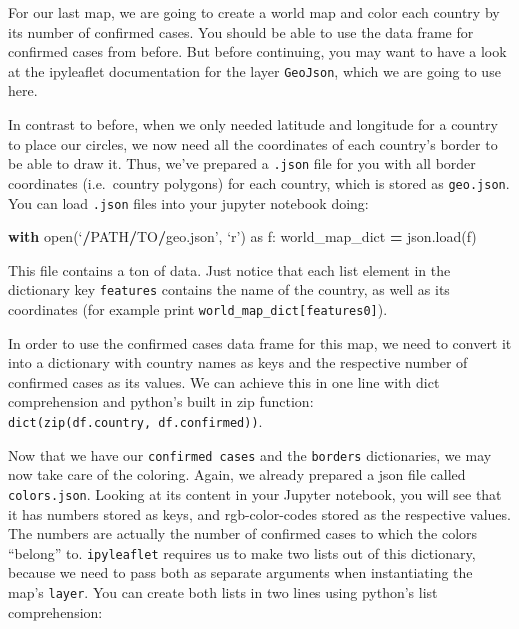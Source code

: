 \documentclass[
  11pt,
]{article}
\newenvironment{Shaded}{\begin{snugshade}}{\end{snugshade}}
\newcommand{\BuiltInTok}[1]{#1}
\newcommand{\ControlFlowTok}[1]{\textcolor[rgb]{0.13,0.29,0.53}{\textbf{#1}}}
\newcommand{\ImportTok}[1]{#1}
\newcommand{\NormalTok}[1]{#1}
\newcommand{\OperatorTok}[1]{\textcolor[rgb]{0.81,0.36,0.00}{\textbf{#1}}}
\newenvironment{tipsp}[1]
  {
  \begin{itemize}
  \footnotesize
  \renewcommand{\labelitemi}{
    \raisebox{-.7\height}[0pt][0pt]{
      {\setkeys{Gin}{width=3em,keepaspectratio}
        \texttt{[image: images/\#1.png]}}
    }
  }
  \setlength{\fboxsep}{1em}
  \begin{pbox}
  \item
  }
  {
  \end{pbox}
  \end{itemize}
  }
\begin{document}
\begin{tipsp}p

For our last map, we are going to create a world map and color each country by its number of confirmed cases.
You should be able to use the data frame for confirmed cases from before. But before continuing, you may want to have a look at the ipyleaflet documentation for the layer \texttt{GeoJson}, which we are going to use here.

In contrast to before, when we only needed latitude and longitude for a country to place our circles, we now need all the coordinates of each country's border to be able to draw it.
Thus, we've prepared a \texttt{.json} file for you with all border coordinates (i.e.~country polygons) for each country, which is stored as \texttt{geo.json}.
You can load \texttt{.json} files into your jupyter notebook doing:

\begin{Shaded}
\begin{Highlighting}[]
\ControlFlowTok{with} \BuiltInTok{open}\NormalTok{(‘}\OperatorTok{/}\NormalTok{PATH}\OperatorTok{/}\NormalTok{TO}\OperatorTok{/}\NormalTok{geo.json’, ‘r’) }\ImportTok{as}\NormalTok{ f:}
\NormalTok{    world\_map\_dict }\OperatorTok{=}\NormalTok{ json.load(f)}
\end{Highlighting}
\end{Shaded}

This file contains a ton of data. Just notice that each list element in the dictionary key \texttt{features} contains the name of the country, as well as its coordinates (for example print \texttt{world\_map\_dict{[}\textquotesingle{}features\textquotesingle{}{]}{[}0{]}}).

In order to use the confirmed cases data frame for this map, we need to convert it into a dictionary with country names as keys and the respective number of confirmed cases as its values. We can achieve this in one line with dict comprehension and python's built in zip function: \texttt{dict(zip(df.country,\ df.confirmed))}.

Now that we have our \texttt{confirmed\ cases} and the \texttt{borders} dictionaries, we may now take care of the coloring.
Again, we already prepared a json file called \texttt{colors.json}. Looking at its content in your Jupyter notebook, you will see that it has numbers stored as keys, and rgb-color-codes stored as the respective values. The numbers are actually the number of confirmed cases to which the colors ``belong'' to.
\texttt{ipyleaflet} requires us to make two lists out of this dictionary, because we need to pass both as separate arguments when instantiating the map's \texttt{layer}.
You can create both lists in two lines using python's list comprehension:


\end{tipsp}
\end{document}
